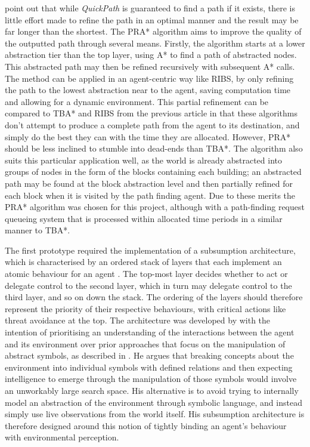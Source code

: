 \documentclass[a4paper,12pt]{article}
\begin{document}
 point out that while \emph{QuickPath} is guaranteed to find a path if it exists, there is little effort made to refine the path in an optimal manner and the result may be far longer than the shortest. The PRA* algorithm aims to improve the quality of the outputted path through several means. Firstly, the algorithm starts at a lower abstraction tier than the top layer, using A* to find a path of abstracted nodes. This abstracted path may then be refined recursively with subsequent A* calls. The method can be applied in an agent-centric way like RIBS, by only refining the path to the lowest abstraction near to the agent, saving computation time and allowing for a dynamic environment. This partial refinement can be compared to TBA* and RIBS from the previous article in that these algorithms don't attempt to produce a complete path from the agent to its destination, and simply do the best they can with the time they are allocated. However, PRA* should be less inclined to stumble into dead-ends than TBA*. The algorithm also suits this particular application well, as the world is already abstracted into groups of nodes in the form of the blocks containing each building; an abstracted path may be found at the block abstraction level and then partially refined for each block when it is visited by the path finding agent. Due to these merits the PRA* algorithm was chosen for this project, although with a path-finding request queueing system that is processed within allocated time periods in a similar manner to TBA*.

The first prototype required the implementation of a subsumption architecture, which is characterised by an ordered stack of layers that each implement an atomic behaviour for an agent \cite{brooks90}. The top-most layer decides whether to act or delegate control to the second layer, which in turn may delegate control to the third layer, and so on down the stack. The ordering of the layers should therefore represent the priority of their respective behaviours, with critical actions like threat avoidance at the top. The architecture was developed by  with the intention of prioritising an understanding of the interactions between the agent and its environment over prior approaches that focus on the manipulation of abstract symbols, as described in . He argues that breaking concepts about the environment into individual symbols with defined relations and then expecting intelligence to emerge through the manipulation of those symbols would involve an unworkably large search space. His alternative is to avoid trying to internally model an abstraction of the environment through symbolic language, and instead simply use live observations from the world itself. His subsumption architecture is therefore designed around this notion of tightly binding an agent's behaviour with environmental perception.
\end{document}
